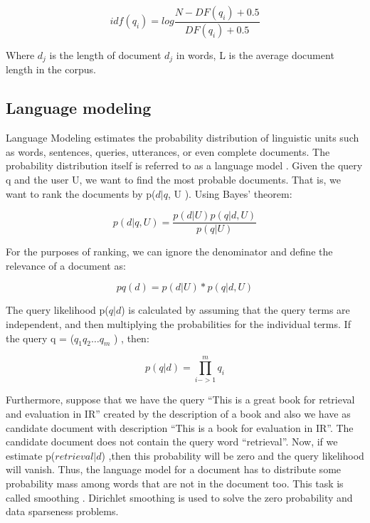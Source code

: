 \begin{equation}
idf(q_i) = log \frac{ N-DF(q_i) + 0.5 } { DF(q_i) +0.5 }
\end{equation}

Where $d_j$ is the length of document $d_j$ in words, L is the average document length in the corpus.

\subsection{Language modeling}

Language Modeling estimates the probability distribution of linguistic units such as words, sentences, queries, utterances, or even complete documents. The probability distribution itself is referred to as a language model \cite{CroftLafferty}. Given the query q and the user U, we want to find the most probable documents. That is, we want to rank the documents by p($d|q$, U ). Using Bayes' theorem:

\begin{equation}
p(d|q, U ) = \frac{p(d|U )p(q|d, U )} {p(q|U)}
\end{equation}

For the purposes of ranking, we can ignore the denominator and define the relevance of a document as:

\begin{equation}
pq (d) = p(d|U ) * p(q|d, U )
\end{equation}

The query likelihood p($q|d$) is calculated by assuming that the query terms are independent, and then multiplying the probabilities for the individual terms. If the query q = ($q_1 q_2 \ldots q_m$ ) , then:

\[p(q|d) =\prod_{i->1}^{m} q_i\]


Furthermore, suppose that we have the query ``This is a great book for retrieval and evaluation in IR'' created by the description of a book and also we have as candidate document with description ``This is a book for evaluation in IR''. The candidate document does not contain the query word ``retrieval''. Now, if we estimate p($retrieval|d$) ,then this probability will be zero and the query likelihood will vanish. Thus, the language model for a document has to distribute some probability mass among words that are not in the document too. This task is called smoothing  \cite{ZhaiLaferty}. Dirichlet smoothing is used to solve the zero probability and data sparseness problems.

